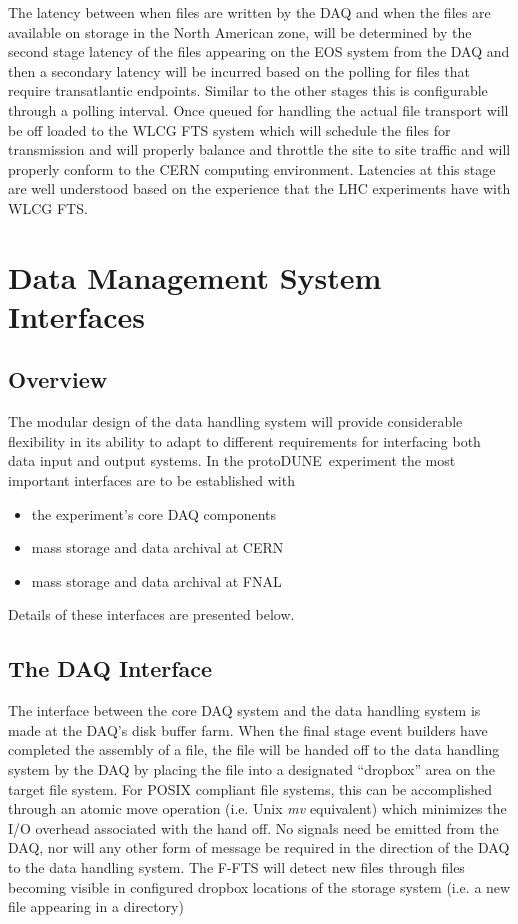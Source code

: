 \documentclass[pdftex,12pt,letter]{article}
\newcommand{\pd}{protoDUNE\ }
\begin{document}
The latency between when files are written by the DAQ and when the files are available on storage in the North American zone,
will be determined by the second stage latency of the files appearing on the EOS system from the DAQ and then a secondary latency
will be incurred based on the polling for files that require transatlantic endpoints.  Similar to the other stages this is configurable
through a polling interval.  Once queued for handling the actual file transport will be off loaded to the WLCG FTS system which will
schedule the files for transmission and will properly balance and throttle the site to site traffic and will properly conform to the CERN
 computing environment.  Latencies at this stage are well understood based on the experience that the LHC experiments have with WLCG FTS.  

\section{Data Management System Interfaces}
\subsection{Overview}
The modular design of the data handling system will provide considerable flexibility in its ability to adapt to different requirements
for interfacing  both data input and output systems.  In the \pd experiment the most important interfaces are to be established with
\begin{itemize}
\item the experiment’s core DAQ components
\item mass storage and data archival at CERN
\item mass storage and data archival at FNAL
\end{itemize}

\noindent
 Details of these interfaces are presented below.

\subsection{The DAQ Interface}
The interface between the core DAQ system and the data handling system is made at the DAQ’s disk buffer farm.
When the final stage event builders have completed the assembly of a file, the file will be handed off to the data handling system
by the DAQ by placing the file into a designated ``dropbox'' area on the target file system.  For POSIX compliant file systems,
this can be accomplished through an atomic move operation (i.e. Unix \textit{mv} equivalent) which minimizes the I/O overhead associated
with the hand off.  No signals need be emitted from the DAQ, nor will any other form of message be required in the direction of the
DAQ to the data handling system.  The F-FTS will detect new files through files becoming visible in configured dropbox locations of
the storage system (i.e. a new file appearing in a directory) 
\end{document}
